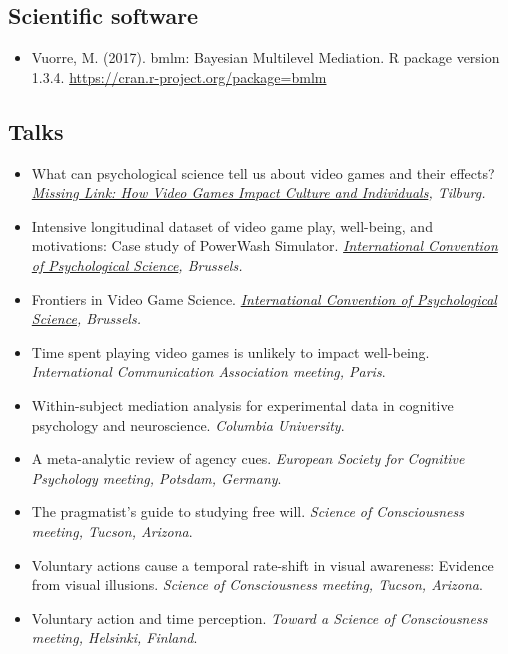 \documentclass[12pt, a4paper]{article}
\newcommand{\years}[1]{\marginnote{\scriptsize #1}}
\begin{document}
\subsection*{Scientific software}
\begin{itemize}
  \item \years{2017} Vuorre, M. (2017). bmlm: Bayesian Multilevel Mediation. R package version 1.3.4. \url{https://cran.r-project.org/package=bmlm}
\end{itemize}

\subsection*{Talks}
\begin{itemize}
  \item \years{2023} What can psychological science tell us about video games and their effects? \emph{\href{https://www.tilburguniversity.edu/campus/studium-generale/missing-link-impact-video-games}{Missing Link: How Video Games Impact Culture and Individuals}, Tilburg.}
  \item Intensive longitudinal dataset of video game play, well-being, and motivations: Case study of PowerWash Simulator. \emph{\href{https://www.psychologicalscience.org/conventions/icps-2023}{International Convention of Psychological Science}, Brussels.}
  \item Frontiers in Video Game Science. \emph{\href{https://www.psychologicalscience.org/conventions/icps-2023}{International Convention of Psychological Science}, Brussels.}
  \item \years{2022} Time spent playing video games is unlikely to impact well-being. \emph{International Communication Association meeting, Paris}.
  \item \years{2018} Within-subject mediation analysis for experimental data in cognitive psychology and neuroscience. \emph{Columbia University}.
  \item \years{2017} A meta-analytic review of agency cues. \emph{European Society for Cognitive Psychology meeting, Potsdam, Germany}.
  \item \years{2016} The pragmatist's guide to studying free will. \emph{Science of Consciousness meeting, Tucson, Arizona}.
  \item Voluntary actions cause a temporal rate-shift in visual awareness: Evidence from visual illusions. \emph{Science of Consciousness meeting, Tucson, Arizona}.
  \item \years{2015} Voluntary action and time perception. \emph{Toward a Science of Consciousness meeting, Helsinki, Finland}.
\end{itemize}
\end{document}
